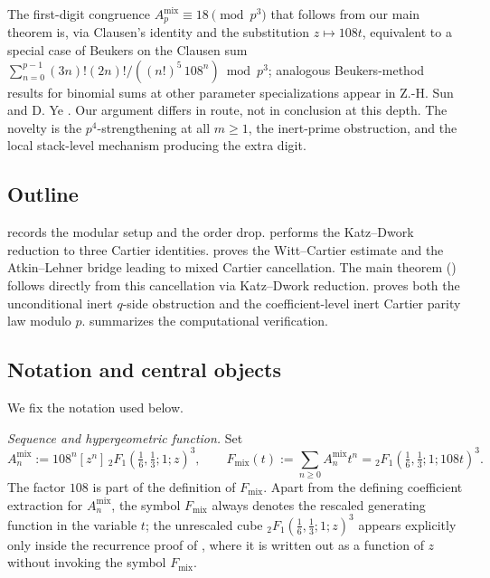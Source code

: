 \documentclass[11pt]{amsart}
\theoremstyle{definition}
\theoremstyle{remark}
\begin{document}
The first-digit congruence
$A_p^{\mathrm{mix}}\equiv 18\pmod{p^3}$
that follows from our main theorem is, via Clausen's identity and the substitution $z\mapsto 108t$, equivalent to a special case of Beukers \cite[Ex.~5.2]{Beukers-mod} on the Clausen sum $\sum_{n=0}^{p-1}(3n)!(2n)!/((n!)^5\,108^n)\bmod p^3$; analogous Beukers-method results for binomial sums at other parameter specializations appear in Z.-H. Sun and D. Ye \cite{SunYe}. Our argument differs in route, not in conclusion at this depth. The novelty is the $p^4$-strengthening at all $m\ge 1$, the inert-prime obstruction, and the local stack-level mechanism producing the extra digit.

\subsection*{Outline}

 records the modular setup and the order drop.  performs the Katz--Dwork reduction to three Cartier identities.  proves the Witt--Cartier estimate and the Atkin--Lehner bridge leading to mixed Cartier cancellation. The main theorem () follows directly from this cancellation via Katz--Dwork reduction.  proves both the unconditional inert $q$-side obstruction and the coefficient-level inert Cartier parity law modulo $p$.  summarizes the computational verification.

\subsection*{Notation and central objects}\label{subsec:notation}

We fix the notation used below.

\emph{Sequence and hypergeometric function.} Set
\[
A_n^{\mathrm{mix}}:=108^n[z^n]\,{}_2F_1\!\left(\tfrac16,\tfrac13;1;z\right)^3,\qquad
F_{\mathrm{mix}}(t):=\sum_{n\ge 0}A_n^{\mathrm{mix}}t^n={}_2F_1\!\left(\tfrac16,\tfrac13;1;108t\right)^3.
\]
The factor $108$ is part of the definition of $F_{\mathrm{mix}}$. Apart from the defining coefficient extraction for $A_n^{\mathrm{mix}}$, the symbol $F_{\mathrm{mix}}$ always denotes the rescaled generating function in the variable $t$; the unrescaled cube ${}_2F_1(\tfrac16,\tfrac13;1;z)^3$ appears explicitly only inside the recurrence proof of , where it is written out as a function of $z$ without invoking the symbol $F_{\mathrm{mix}}$.
 
\end{document}
